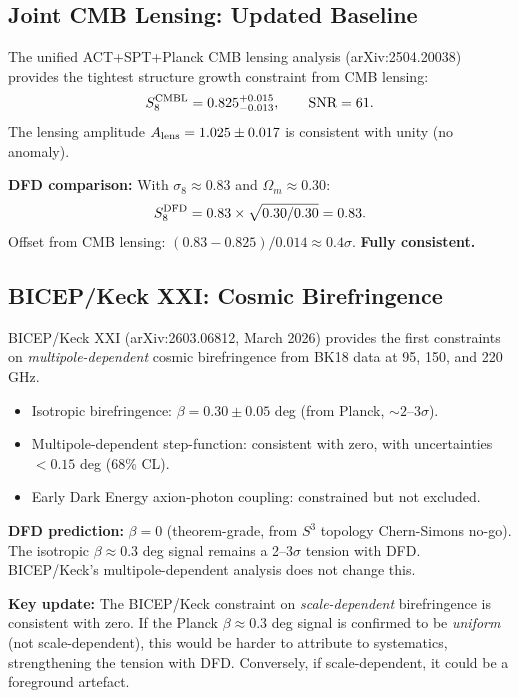\documentclass[11pt]{article}
\newcommand{\Om}{\Omega_m}
\begin{document}
\subsection{Joint CMB Lensing: Updated Baseline}

The unified ACT+SPT+Planck CMB lensing analysis (arXiv:2504.20038)
provides the tightest structure growth constraint from CMB lensing:
\begin{equation}
  S_8^{\rm CMBL} = 0.825^{+0.015}_{-0.013}, \qquad \text{SNR} = 61.
\end{equation}
The lensing amplitude $A_{\rm lens} = 1.025 \pm 0.017$ is consistent
with unity (no anomaly).

\textbf{DFD comparison:} With $\sigma_8 \approx 0.83$ and
$\Om \approx 0.30$:
\begin{equation}
  S_8^{\rm DFD} = 0.83 \times \sqrt{0.30/0.30} = 0.83.
\end{equation}
Offset from CMB lensing: $(0.83 - 0.825)/0.014 \approx 0.4\sigma$.
\textbf{Fully consistent.}

\subsection{BICEP/Keck XXI: Cosmic Birefringence}

BICEP/Keck XXI (arXiv:2603.06812, March 2026) provides the first
constraints on \emph{multipole-dependent} cosmic birefringence from
BK18 data at 95, 150, and 220 GHz.

\begin{itemize}
  \item Isotropic birefringence: $\beta = 0.30 \pm 0.05$ deg
    (from Planck, $\sim 2$--3$\sigma$).
  \item Multipole-dependent step-function: consistent with zero,
    with uncertainties $< 0.15$ deg (68\% CL).
  \item Early Dark Energy axion-photon coupling: constrained but
    not excluded.
\end{itemize}

\textbf{DFD prediction:} $\beta = 0$ (theorem-grade, from $S^3$
topology Chern-Simons no-go). The isotropic $\beta \approx 0.3$ deg
signal remains a 2--3$\sigma$ tension with DFD. BICEP/Keck's
multipole-dependent analysis does not change this.

\textbf{Key update:} The BICEP/Keck constraint on
\emph{scale-dependent} birefringence is consistent with zero.
If the Planck $\beta \approx 0.3$ deg signal is confirmed to be
\emph{uniform} (not scale-dependent), this would be harder to
attribute to systematics, strengthening the tension with DFD.
Conversely, if scale-dependent, it could be a foreground artefact.
\end{document}
